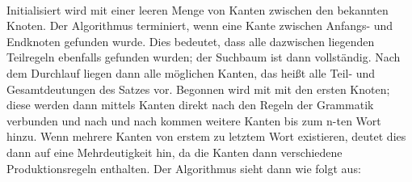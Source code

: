\documentclass[12pt]{paper}
\begin{document}
\\
Initialisiert wird mit einer leeren Menge von Kanten zwischen den bekannten Knoten. Der Algorithmus terminiert, wenn eine Kante zwischen Anfangs- und Endknoten gefunden wurde. Dies bedeutet, dass alle dazwischen liegenden Teilregeln ebenfalls gefunden wurden; der Suchbaum ist dann vollständig. Nach dem Durchlauf liegen dann alle möglichen Kanten, das heißt alle Teil- und Gesamtdeutungen des Satzes vor. Begonnen wird mit mit den ersten Knoten; diese werden dann mittels Kanten direkt nach den Regeln der Grammatik verbunden und nach und nach kommen weitere Kanten bis zum n-ten Wort hinzu. Wenn mehrere Kanten von erstem zu letztem Wort existieren, deutet dies dann auf eine Mehrdeutigkeit hin, da die Kanten dann verschiedene Produktionsregeln enthalten. Der Algorithmus sieht dann wie folgt aus:
\end{document}
